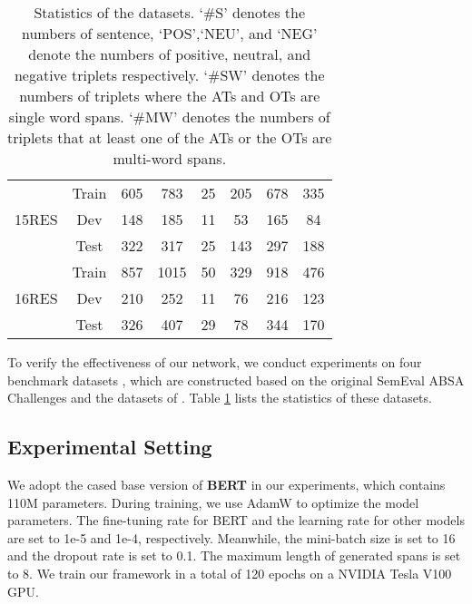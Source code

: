 \documentclass[11pt]{article}
\begin{document}
\begin{table}[t]
\begin{tabular}{cc|cccccc}
		\multicolumn{1}{c|}{\multirow{3}{*}{15RES}} & Train & 605                       & 783                       & 25                       & 205                       & 678                          & 335                        \\
		\multicolumn{1}{c|}{}                       & Dev   & 148                       & 185                       & 11                       & 53                        & 165                          & 84                         \\
		\multicolumn{1}{c|}{}                       & Test  & 322                       & 317                       & 25                       & 143                       & 297                          & 188                        \\ \hline
		\multicolumn{1}{c|}{\multirow{3}{*}{16RES}} & Train & 857                       & 1015                      & 50                       & 329                       & 918                          & 476                        \\
		\multicolumn{1}{c|}{}                       & Dev   & 210                       & 252                       & 11                       & 76                        & 216                          & 123                        \\
		\multicolumn{1}{c|}{}                       & Test  & 326                       & 407                       & 29                       & 78                        & 344                          & 170                        \\ \hline
	\end{tabular}
	\caption{Statistics of the datasets. `\#S' denotes the numbers of sentence, `POS',`NEU', and `NEG' denote the numbers of positive, neutral, and negative triplets respectively. `\#SW' denotes the numbers of triplets where the ATs and OTs are single word spans. `\#MW' denotes the numbers of triplets that at least one of the ATs or the OTs are multi-word spans.}
	\label{datasets}
\end{table}	

To verify the effectiveness of our network, we conduct experiments on four benchmark datasets\footnotemark \cite{DBLP:conf/emnlp/XuLLB20} , which are constructed based on the original SemEval ABSA Challenges and the datasets of \cite{DBLP:conf/naacl/FanWDHC19}. Table \ref{datasets} lists the statistics of these datasets.


\subsection{Experimental Setting}
We adopt the cased base version of \textbf{BERT} \cite{devlin2018bert} in our experiments, which contains 110M parameters. During training, we use AdamW \cite{DBLP:journals/corr/abs-1711-05101} to optimize the model parameters. The fine-tuning rate for BERT and the learning rate for other models are set to 1e-5 and 1e-4, respectively. Meanwhile, the mini-batch size is set to 16 and the dropout rate is set to 0.1. The maximum length of generated spans is set to 8. We train our framework in a total of 120 epochs on a NVIDIA Tesla V100 GPU. 
\end{document}
